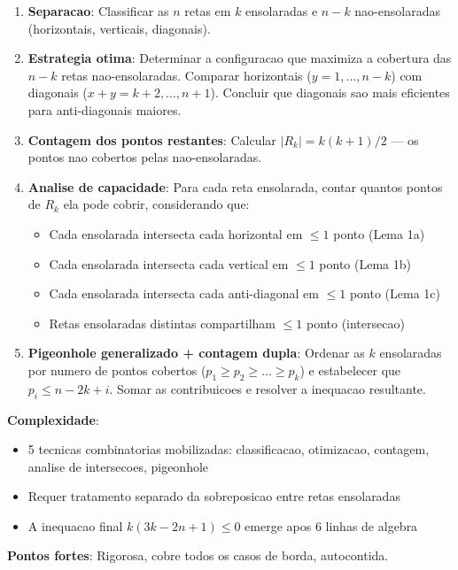 \documentclass[5p]{elsarticle}
\theoremstyle{definition}
\begin{document}
\begin{enumerate}[label=\textbf{A\arabic*}.]
  \item \textbf{Separacao}: Classificar as $n$ retas em $k$ ensolaradas e $n-k$
    nao-ensolaradas (horizontais, verticais, diagonais).
  \item \textbf{Estrategia otima}: Determinar a configuracao que maximiza a cobertura
    das $n-k$ retas nao-ensolaradas. Comparar horizontais ($y=1,\dots,n-k$) com
    diagonais ($x+y=k+2,\dots,n+1$). Concluir que diagonais sao mais eficientes
    para anti-diagonais maiores.
  \item \textbf{Contagem dos pontos restantes}: Calcular $|R_k| = k(k+1)/2$ — os
    pontos nao cobertos pelas nao-ensolaradas.
  \item \textbf{Analise de capacidade}: Para cada reta ensolarada, contar quantos
    pontos de $R_k$ ela pode cobrir, considerando que:
    \begin{itemize}
      \item Cada ensolarada intersecta cada horizontal em $\leq 1$ ponto (Lema 1a)
      \item Cada ensolarada intersecta cada vertical em $\leq 1$ ponto (Lema 1b)
      \item Cada ensolarada intersecta cada anti-diagonal em $\leq 1$ ponto (Lema 1c)
      \item Retas ensolaradas distintas compartilham $\leq 1$ ponto (intersecao)
    \end{itemize}
  \item \textbf{Pigeonhole generalizado + contagem dupla}: Ordenar as $k$ ensolaradas
    por numero de pontos cobertos ($p_1 \geq p_2 \geq \dots \geq p_k$) e estabelecer
    que $p_i \leq n - 2k + i$. Somar as contribuicoes e resolver a inequacao resultante.
\end{enumerate}

\textbf{Complexidade}:
\begin{itemize}
  \item 5 tecnicas combinatorias mobilizadas: classificacao, otimizacao, contagem,
    analise de intersecoes, pigeonhole
  \item Requer tratamento separado da sobreposicao entre retas ensolaradas
  \item A inequacao final $k(3k-2n+1) \leq 0$ emerge apos 6 linhas de algebra
\end{itemize}

\textbf{Pontos fortes}: Rigorosa, cobre todos os casos de borda, autocontida.
\end{document}
